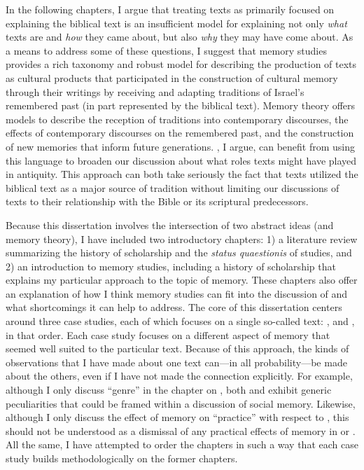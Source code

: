 In the following chapters, I argue that treating \rwb texts as primarily focused on explaining the biblical text is an insufficient model for explaining not only \emph{what} \rwb texts are and \emph{how} they came about, but also \emph{why} they may have come about. As a means to address some of these questions, I suggest that memory studies provides a rich taxonomy and robust model for describing the production of \rwb texts as cultural products that participated in the construction of cultural memory through their writings by receiving and adapting traditions of Israel's remembered past (in part represented by the biblical text). Memory theory offers models to describe the reception of traditions into contemporary discourses, the effects of contemporary discourses on the remembered past, and the construction of new memories that inform future generations. \rwb, I argue, can benefit from using this language to broaden our discussion about what roles \rwb texts might have played in antiquity. This approach can both take seriously the fact that \rwb texts utilized the biblical text as a major source of tradition without limiting our discussions of \rwb texts to their relationship with the Bible or its scriptural predecessors.



Because this dissertation involves the intersection of two abstract ideas (\rwb and memory theory), I have included two introductory chapters: 1) a literature review summarizing the history of scholarship and the \emph{status quaestionis} of \rwb studies, and 2) an introduction to memory studies, including a history of scholarship that explains my particular approach to the topic of memory. These chapters also offer an explanation of how I think memory studies can fit into the discussion of \rwb and what shortcomings it can help to address. The core of this dissertation centers around three case studies, each of which focuses on a single so-called \rwb text: \chronicles, \ga and \jub, in that order. Each case study focuses on a different aspect of memory that seemed well suited to the particular text. Because of this approach, the kinds of observations that I have made about one text can---in all probability---be made about the others, even if I have not made the connection explicitly. For example, although I only discuss ``genre'' in the chapter on \ga, both \chronicles and \jub exhibit generic peculiarities that could be framed within a discussion of social memory. Likewise, although I only discuss the effect of memory on ``practice'' with respect to \jub, this should not be understood as a dismissal of any practical effects of memory in \chronicles or \ga. All the same, I have attempted to order the chapters in such a way that each case study builds methodologically on the former chapters.

